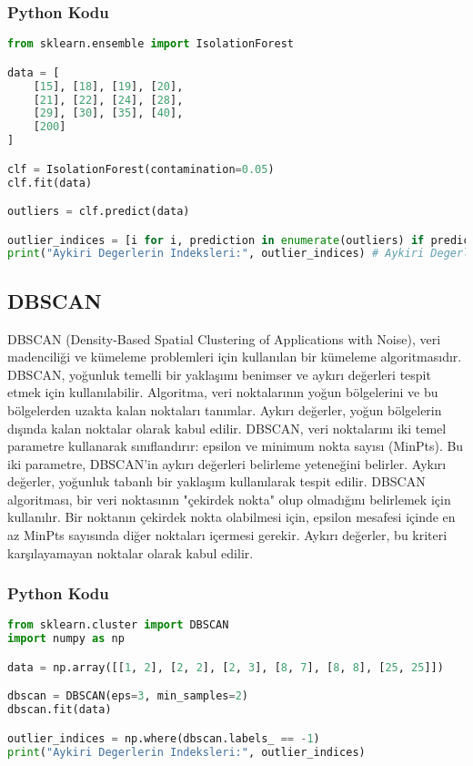 \subsubsection{Python Kodu}

\begin{lstlisting}[language=Python]
from sklearn.ensemble import IsolationForest

data = [
    [15], [18], [19], [20],
    [21], [22], [24], [28],
    [29], [30], [35], [40],
    [200]
]

clf = IsolationForest(contamination=0.05)
clf.fit(data)

outliers = clf.predict(data)

outlier_indices = [i for i, prediction in enumerate(outliers) if prediction == -1]
print("Aykiri Degerlerin Indeksleri:", outlier_indices) # Aykiri Degerlerin Indeksleri: [12]
\end{lstlisting}

\newpage

\subsection{DBSCAN}
DBSCAN (Density-Based Spatial Clustering of Applications with Noise), veri madenciliği ve kümeleme problemleri için kullanılan bir kümeleme algoritmasıdır. DBSCAN, yoğunluk temelli bir yaklaşımı benimser ve aykırı değerleri tespit etmek için kullanılabilir. Algoritma, veri noktalarının yoğun bölgelerini ve bu bölgelerden uzakta kalan noktaları tanımlar. Aykırı değerler, yoğun bölgelerin dışında kalan noktalar olarak kabul edilir. DBSCAN, veri noktalarını iki temel parametre kullanarak sınıflandırır: epsilon ve minimum nokta sayısı (MinPts). Bu iki parametre, DBSCAN'in aykırı değerleri belirleme yeteneğini belirler. Aykırı değerler, yoğunluk tabanlı bir yaklaşım kullanılarak tespit edilir. DBSCAN algoritması, bir veri noktasının "çekirdek nokta" olup olmadığını belirlemek için kullanılır. Bir noktanın çekirdek nokta olabilmesi için, epsilon mesafesi içinde en az MinPts sayısında diğer noktaları içermesi gerekir. Aykırı değerler, bu kriteri karşılayamayan noktalar olarak kabul edilir.

\subsubsection{Python Kodu}

\begin{lstlisting}[language=Python]
from sklearn.cluster import DBSCAN
import numpy as np

data = np.array([[1, 2], [2, 2], [2, 3], [8, 7], [8, 8], [25, 25]])

dbscan = DBSCAN(eps=3, min_samples=2)
dbscan.fit(data)

outlier_indices = np.where(dbscan.labels_ == -1)
print("Aykiri Degerlerin Indeksleri:", outlier_indices)
\end{lstlisting}

